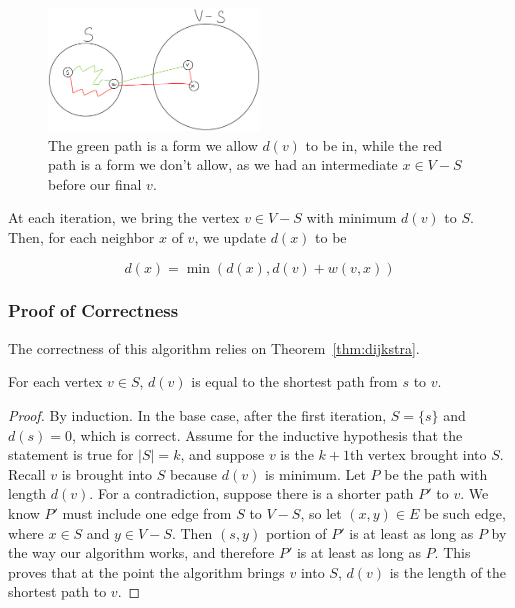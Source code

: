\begin{figure}[hpt]
    \centering
    \includegraphics[width=0.5\textwidth]{figures/dijkstra.jpeg}
    \caption{The green path is a form we allow $d(v)$ to be in, while
    the red path is a form we don't allow, as we had an intermediate
    $x \in V - S$ before our final $v$.}
    \label{fig:dijkstra}
\end{figure}

At each iteration, we bring the vertex $v \in V - S$ with minimum 
$d(v)$ to $S$. Then, for each neighbor $x$ of $v$, we update $d(x)$ to
be

$$
d(x) = \min(d(x), d(v) + w(v, x))
$$

\subsubsection{Proof of Correctness}

The correctness of this algorithm relies on Theorem~\ref{thm:dijkstra}.

\begin{theorem}\label{thm:dijkstra}
    For each vertex $v \in S$, $d(v)$ is equal to the shortest
    path from $s$ to $v$.
\end{theorem}

\begin{proof}
    By induction. In the base case, after the first iteration,
    $S = \{s\}$ and $d(s) = 0$, which is correct. Assume for the
    inductive hypothesis that the statement is true for
    $|S| = k$, and suppose $v$ is the $k+1$th vertex brought into $S$.
    Recall $v$ is brought into $S$ because $d(v)$ is minimum. Let
    $P$ be the path with length $d(v)$. For a contradiction, suppose
    there is a shorter path $P'$ to $v$. We know $P'$ must include
    one edge from $S$ to $V - S$, so let $(x, y) \in E$ be such edge,
    where $x \in S$ and $y \in V - S$.
    Then $(s, y)$ portion of $P'$ is at least as long as $P$ by the
    way our algorithm works, and therefore $P'$ is at least as long as
    $P$. This proves that at the point the algorithm brings $v$ into
    $S$, $d(v)$ is the length of the shortest path to $v$. 
\end{proof}

